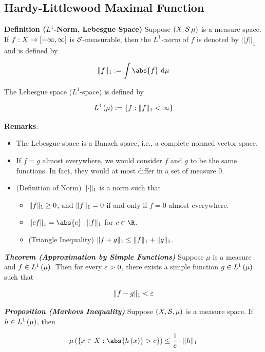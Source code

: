 \documentclass[
]{article}
\begin{document}
\hypertarget{hardy-littlewood-maximal-function}{%
\subsection{Hardy-Littlewood Maximal
Function}\label{hardy-littlewood-maximal-function}}

\textbf{Definition (\(L^1\)-Norm, Lebesgue Space)} Suppose
\(\pr{X,\S\,\mu}\) is a measure space. If \(f:X\to\br{-\infty,\infty}\)
is \(\S\)-measurable, then the \emph{\(L^1\)-norm} of \(f\) is denoted
by \(||f||_1\) and is defined by

\[\| f\|_1 := \int \abs{f}\dm\]

The Lebesgue space (\(L^1\)-space) is defined by

\[L^1\pr{\mu}:=\brace{f:\norm{f}<\infty}\]

\textbf{Remarks}:

\begin{itemize}
\item
  The Lebesgue space is a Banach space, i.e., a complete normed vector
  space.
\item
  If \(f = g\) almost everywhere, we would consider \(f\) and \(g\) to
  be the same functions. In fact, they would at most differ in a set of
  measure \(0\).
\item
  (Definition of Norm) \(\norm{\cdot}\) is a norm such that

  \begin{itemize}
  \item
    \(\norm{f}\ge 0\), and \(\norm{f} = 0\) if and only if \(f = 0\)
    almost everywhere.
  \item
    \(\norm{cf} = \abs{c}\cdot \norm{f}\) for \(c\in \R\).
  \item
    (Triangle Inequality) \(\norm{f+g}\le \norm{f}+\norm{g}\).
  \end{itemize}
\end{itemize}

\emph{\textbf{Theorem (Approximation by Simple Functions)}} Suppose
\(\mu\) is a measure and \(f\in L^1\pr{\mu}\). Then for every \(\ve>0\),
there exists a simple function \(g\in L^1\pr{\mu}\) such that

\[\norm{f-g}<\ve\]

\emph{\textbf{Proposition (Markov\textquotesingle s Inequality)}}
Suppose \(\pr{X,\S,\mu}\) is a measure space. If \(h\in L^1\pr{\mu}\),
then

\[\lm{\brace{x\in X:\abs{h\pr{x}}>c}}\le \frac{1}{c}\cdot \norm{h}\]
\end{document}
